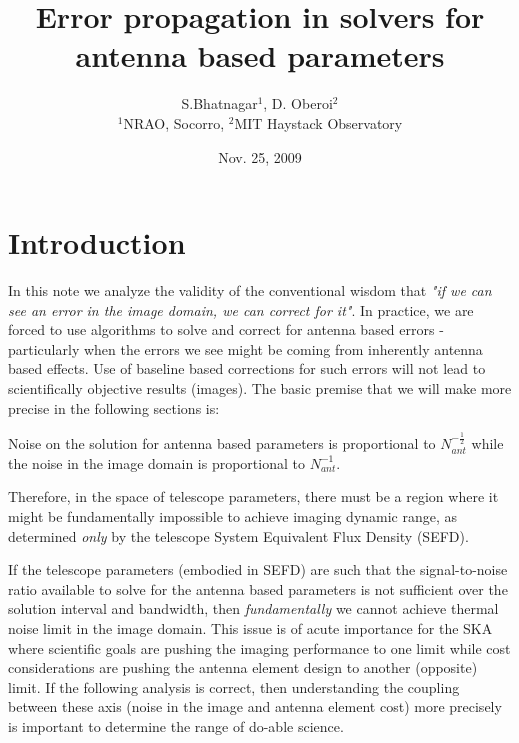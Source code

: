 \documentclass[11pt]{article}
\begin{document}
\title{Error propagation in solvers for antenna based parameters}
\author{S.Bhatnagar$^{1}$, D. Oberoi$^{2}$\\ $^{1}$NRAO, Socorro, $^{2}$MIT Haystack Observatory}
\date{Nov. 25, 2009}
\maketitle
\normalsize



\section{Introduction}

In this note we analyze the validity of the conventional wisdom that
{\it "if we can see an error in the image domain, we can correct for
  it"}.  In practice, we are forced to use algorithms to solve and
correct for antenna based errors - particularly when the errors we see
might be coming from inherently antenna based effects. Use of baseline
based corrections for such errors will not lead to scientifically
objective results (images).  %
The basic premise that we will make more precise in the following
sections is:
\begin{description}
\item Noise on the solution for antenna based parameters is
  proportional to ${N^{-\frac{1}{2}}_{ant}}$ while the noise in the
  image domain is proportional to $N^{-1}_{ant}$.
\item Therefore, in the space of telescope parameters, there must be a
  region where it might be fundamentally impossible to achieve imaging
  dynamic range, as determined {\it only} by the telescope System
  Equivalent Flux Density (SEFD).
\end{description}

If the telescope parameters (embodied in SEFD) are such that the
signal-to-noise ratio available to solve for the antenna based
parameters is not sufficient over the solution interval and bandwidth,
then {\it fundamentally} we cannot achieve thermal noise limit in the
image domain.  %
This issue is of acute importance for the SKA where scientific goals
are pushing the imaging performance to one limit while cost
considerations are pushing the antenna element design to another
(opposite) limit.  If the following analysis is correct, then
understanding the coupling between these axis (noise in the image and
antenna element cost) more precisely is important to determine the
range of do-able science.
\end{document}
